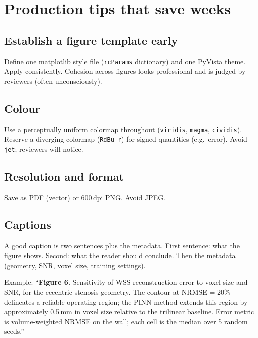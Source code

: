 \documentclass[11pt]{article}
\begin{document}
\section{Production tips that save weeks}

\subsection*{Establish a figure template early}
Define one matplotlib style file (\texttt{rcParams} dictionary) and one PyVista theme. Apply consistently. Cohesion across figures looks professional and is judged by reviewers (often unconsciously).

\subsection*{Colour}
Use a perceptually uniform colormap throughout (\texttt{viridis}, \texttt{magma}, \texttt{cividis}). Reserve a diverging colormap (\texttt{RdBu\_r}) for signed quantities (e.g.\ error). Avoid \texttt{jet}; reviewers will notice.

\subsection*{Resolution and format}
Save as PDF (vector) or 600\,dpi PNG. Avoid JPEG.

\subsection*{Captions}
A good caption is two sentences plus the metadata. First sentence: what the figure shows. Second: what the reader should conclude. Then the metadata (geometry, SNR, voxel size, training settings).

Example: ``\textbf{Figure 6.} Sensitivity of WSS reconstruction error to voxel size and SNR, for the eccentric-stenosis geometry. The contour at NRMSE = 20\% delineates a reliable operating region; the PINN method extends this region by approximately 0.5\,mm in voxel size relative to the trilinear baseline. Error metric is volume-weighted NRMSE on the wall; each cell is the median over 5 random seeds.''
\end{document}
